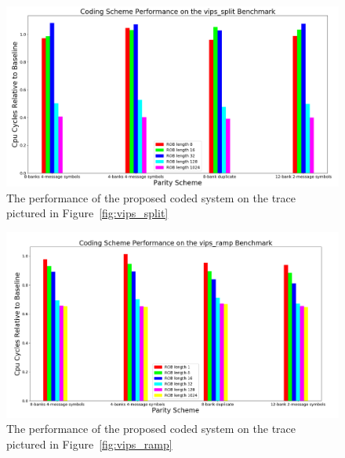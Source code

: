 \begin{figure}[h!]
		\includegraphics[width=\linewidth]{figures/vips_split_results.png}
		\caption{The performance of the proposed coded system on the trace pictured in Figure~\ref{fig:vips_split}}
		\label{fig:vips_split_results}
\end{figure}


\begin{figure}[h!]
		\includegraphics[width=\linewidth]{figures/vips_ramp_results.png}
		\caption{The performance of the proposed coded system on the trace pictured in Figure~\ref{fig:vips_ramp}}
		\label{fig:vips_ramp_results}
\end{figure}